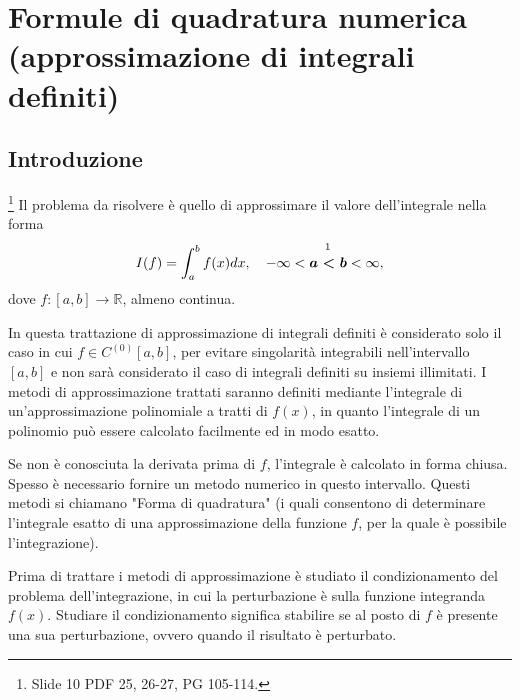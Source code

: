 \section{Formule di quadratura numerica (approssimazione di integrali definiti)}
\subsection{Introduzione}
\footnote{Slide 10 PDF 25, 26-27, PG 105-114.} Il problema da risolvere è quello di approssimare il valore dell'integrale nella forma
\begin{equation}\label{eq:problema_quadratura}
    I(f)=\int_{a}^{b}f(x) dx,\quad -\infty<\overset{\footnotemark}{\boldsymbol{a<b}}<\infty ,
\end{equation}
dove $f:[a,b]\rightarrow\mathbb R$, almeno continua.

In questa trattazione di approssimazione di integrali definiti è considerato solo il caso in cui $f\in C^{(0)}[a,b]$, per evitare singolarità integrabili nell'intervallo $[a,b]$ e non sarà considerato il caso di integrali definiti su insiemi illimitati. I metodi di approssimazione trattati saranno definiti mediante l'integrale di un'approssimazione polinomiale a tratti di $f(x)$, in quanto l'integrale di un polinomio può essere calcolato facilmente ed in modo esatto.

Se non è conosciuta la derivata prima di $f$, l'integrale è calcolato in forma chiusa. Spesso è necessario fornire un metodo numerico in questo intervallo. Questi metodi si chiamano "Forma di quadratura" (i quali consentono di determinare l'integrale esatto di una approssimazione della funzione $f$, per la quale è possibile l'integrazione).

Prima di trattare i metodi di approssimazione è studiato il condizionamento del problema dell'integrazione, in cui la perturbazione è sulla funzione integranda $f(x)$. Studiare il condizionamento significa stabilire se al posto di $f$ è presente una sua perturbazione, ovvero quando il risultato è perturbato.

